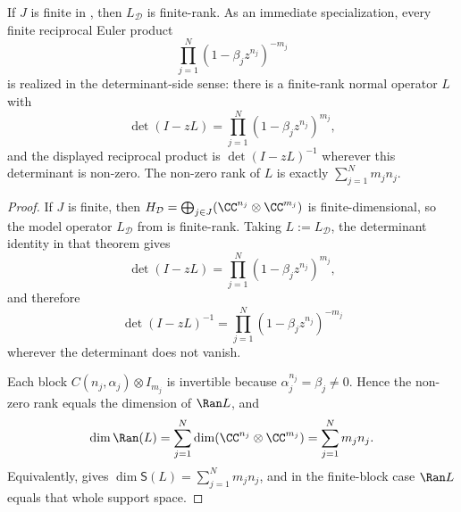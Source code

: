 \begin{corollary}
  \label{cor:finite-rank-realization}
  If \(J\) is finite in , then
  \(L_{\mathcal D}\) is finite-rank. As an immediate specialization,
  every finite reciprocal Euler product
  \[
    \prod_{j=1}^N(1-\beta_j z^{n_j})^{-m_j}
  \]
  is realized in the determinant-side sense: there is a finite-rank normal
  operator \(L\) with
  \[
    \det(I-zL)=\prod_{j=1}^N(1-\beta_j z^{n_j})^{m_j},
  \]
  and the displayed reciprocal product is \(\det(I-zL)^{-1}\) wherever
  this determinant is non-zero. The non-zero rank of \(L\) is exactly
  \(\sum_{j=1}^N m_j n_j\).
\end{corollary}

\begin{proof}
  If \(J\) is finite, then
  \(H_{\mathcal D}=\bigoplus_{j\in J}(\CC^{n_j}\otimes\CC^{m_j})\) is
  finite-dimensional, so the model operator \(L_{\mathcal D}\) from
   is finite-rank. Taking
  \(L:=L_{\mathcal D}\), the determinant identity in that theorem gives
  \[
    \det(I-zL)=\prod_{j=1}^N(1-\beta_j z^{n_j})^{m_j},
  \]
  and therefore
  \[
    \det(I-zL)^{-1}=\prod_{j=1}^N(1-\beta_j z^{n_j})^{-m_j}
  \]
  wherever the determinant does not vanish.

  Each block \(C(n_j,\alpha_j)\otimes I_{m_j}\) is invertible because
  \(\alpha_j^{n_j}=\beta_j\neq0\). Hence the non-zero rank equals the
  dimension of \(\Ran L\), and
  \[
    \dim\Ran(L)
    =\sum_{j=1}^N \dim(\CC^{n_j}\otimes\CC^{m_j})
    =\sum_{j=1}^N m_jn_j.
  \]
  Equivalently,  gives
  \(\dim\mathsf S(L)=\sum_{j=1}^N m_jn_j\), and in the finite-block case
  \(\Ran L\) equals that whole support space.
\end{proof}
